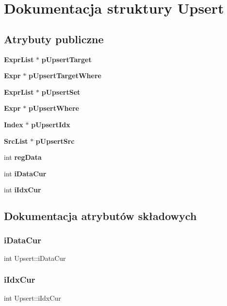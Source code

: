 \section{Dokumentacja struktury Upsert}
\label{struct_upsert}
\subsection*{Atrybuty publiczne}
\begin{DoxyCompactItemize}
\item 
\textbf{ Expr\+List} $\ast$ \textbf{ p\+Upsert\+Target}
\item 
\textbf{ Expr} $\ast$ \textbf{ p\+Upsert\+Target\+Where}
\item 
\textbf{ Expr\+List} $\ast$ \textbf{ p\+Upsert\+Set}
\item 
\textbf{ Expr} $\ast$ \textbf{ p\+Upsert\+Where}
\item 
\textbf{ Index} $\ast$ \textbf{ p\+Upsert\+Idx}
\item 
\textbf{ Src\+List} $\ast$ \textbf{ p\+Upsert\+Src}
\item 
int \textbf{ reg\+Data}
\item 
int \textbf{ i\+Data\+Cur}
\item 
int \textbf{ i\+Idx\+Cur}
\end{DoxyCompactItemize}


\subsection{Dokumentacja atrybutów składowych}
\mbox{\label{struct_upsert_a8650f83a9c55c609980deffed8c3ced8}} 
\subsubsection{iDataCur}
{\footnotesize\ttfamily int Upsert\+::i\+Data\+Cur}

\mbox{\label{struct_upsert_afa03ce78400b1f607648bb2739df88ec}} 
\subsubsection{iIdxCur}
{\footnotesize\ttfamily int Upsert\+::i\+Idx\+Cur}

\mbox{\label{struct_upsert_a9524aa52c709d36baff2fed94a814cc9}} 

